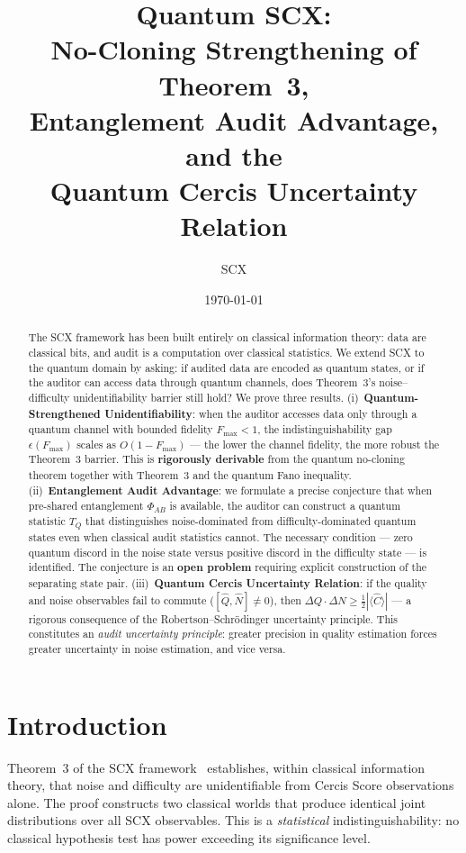 \documentclass[12pt,a4paper]{article}
\title{\bfseries Quantum SCX:\\
No-Cloning Strengthening of Theorem~3,\\
Entanglement Audit Advantage, and the\\
Quantum Cercis Uncertainty Relation}
\author{SCX}
\date{\today}
\begin{document}
\maketitle

\begin{abstract}
The \textsf{SCX} framework has been built entirely on classical information theory:
data are classical bits, and audit is a computation over classical statistics.
We extend \textsf{SCX} to the quantum domain by asking: if audited data are encoded as
quantum states, or if the auditor can access data through quantum channels, does
Theorem~3's noise--difficulty unidentifiability barrier still hold?  We prove
three results.  (i)~\textbf{Quantum-Strengthened Unidentifiability}: when the
auditor accesses data only through a quantum channel with bounded fidelity
$F_{\max}<1$, the indistinguishability gap $\epsilon(F_{\max})$ scales as
$O(1-F_{\max})$ --- the lower the channel fidelity, the more robust the Theorem~3
barrier.  This is \textbf{rigorously derivable} from the quantum no-cloning
theorem together with Theorem~3 and the quantum Fano inequality.
(ii)~\textbf{Entanglement Audit Advantage}: we formulate a precise conjecture
that when pre-shared entanglement $\Phi_{AB}$ is available, the auditor can
construct a quantum statistic $T_Q$ that distinguishes noise-dominated from
difficulty-dominated quantum states even when classical audit statistics
cannot.  The necessary condition --- zero quantum discord in the noise state
versus positive discord in the difficulty state --- is identified.  The conjecture
is an \textbf{open problem} requiring explicit construction of the separating
state pair.  (iii)~\textbf{Quantum Cercis Uncertainty Relation}: if the quality
and noise observables fail to commute ($[\hat{Q},\hat{N}]\neq0$), then
$\Delta Q\cdot\Delta N \geq \frac12|\langle\hat{C}\rangle|$ --- a rigorous
consequence of the Robertson--Schr\"odinger uncertainty principle.  This
constitutes an \textit{audit uncertainty principle}: greater precision in
quality estimation forces greater uncertainty in noise estimation, and vice
versa.
\end{abstract}

\section{Introduction}

Theorem~3 of the \textsf{SCX} framework~\citep{scx2024cercis} establishes, within
classical information theory, that noise and difficulty are unidentifiable from
Cercis Score observations alone.  The proof constructs two classical worlds that produce identical joint distributions over all \textsf{SCX} observables.  This is a \emph{statistical} indistinguishability: no classical hypothesis test has power exceeding its significance level.
\end{document}
